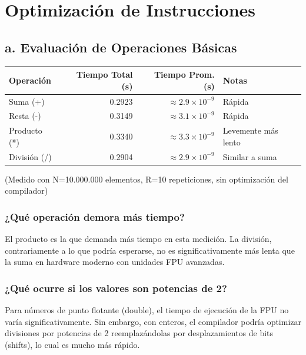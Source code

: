 \documentclass[11pt,a4paper]{article}
\begin{document}
\section{Optimización de Instrucciones}

\subsection*{a. Evaluación de Operaciones Básicas}

\begin{center}
\begin{tabular}{|l|r|r|l|}
\hline
\textbf{Operación} & \textbf{Tiempo Total (s)} & \textbf{Tiempo Prom. (s)} & \textbf{Notas} \\
\hline
Suma (+)     & 0.2923 & $\approx 2.9 \times 10^{-9}$ & Rápida \\
Resta (-)    & 0.3149 & $\approx 3.1 \times 10^{-9}$ & Rápida \\
Producto (*) & 0.3340 & $\approx 3.3 \times 10^{-9}$ & Levemente más lento \\
División (/) & 0.2904 & $\approx 2.9 \times 10^{-9}$ & Similar a suma \\
\hline
\end{tabular}
\end{center}

(Medido con N=10.000.000 elementos, R=10 repeticiones, sin optimización del compilador)

\subsubsection*{¿Qué operación demora más tiempo?}

El producto es la que demanda más tiempo en esta medición. La división, contrariamente a lo que podría esperarse, no es significativamente más lenta que la suma en hardware moderno con unidades FPU avanzadas.

\subsubsection*{¿Qué ocurre si los valores son potencias de 2?}

Para números de punto flotante (double), el tiempo de ejecución de la FPU no varía significativamente. Sin embargo, con enteros, el compilador podría optimizar divisiones por potencias de 2 reemplazándolas por desplazamientos de bits (shifts), lo cual es mucho más rápido.
\end{document}
